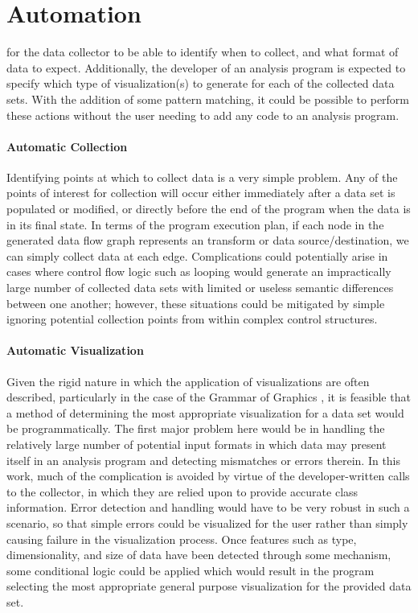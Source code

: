 \section{Automation}
\label{sec:automation}
 for the data collector to be able to identify when to collect, and what format of data to expect. Additionally, the developer of an analysis program is expected to specify which type of visualization(s) to generate for each of the collected data sets. With the addition of some pattern matching, it could be possible to perform these actions without the user needing to add any code to an analysis program.

\paragraph{Automatic Collection}
Identifying points at which to collect data is a very simple problem. Any of the points of interest for collection will occur either immediately after a data set is populated or modified, or directly before the end of the program when the data is in its final state. In terms of the program execution plan, if each node in the generated data flow graph represents an transform or data source/destination, we can simply collect data at each edge. Complications could potentially arise in cases where control flow logic such as looping would generate an impractically large number of collected data sets with limited or useless semantic differences between one another; however, these situations could be mitigated by simple ignoring potential collection points from within complex control structures.

\paragraph{Automatic Visualization}
Given the rigid nature in which the application of visualizations  are often described, particularly in the case of the Grammar of Graphics \cite{Wilkinson2005}, it is feasible that a method of determining the most appropriate visualization for a data set would be programmatically. The first major problem here would be in handling the relatively large number of potential input formats in which data may present itself in an analysis program and detecting mismatches or errors therein. In this work, much of the complication is avoided by virtue of the developer-written calls to the collector, in which they are relied upon to provide accurate class information. Error detection and handling would have to be very robust in such a scenario, so that simple errors could be visualized for the user rather than simply causing failure in the visualization process. Once features such as type, dimensionality, and size of data have been detected through some mechanism, some conditional logic could be applied which would result in the program selecting the most appropriate general purpose visualization for the provided data set.  